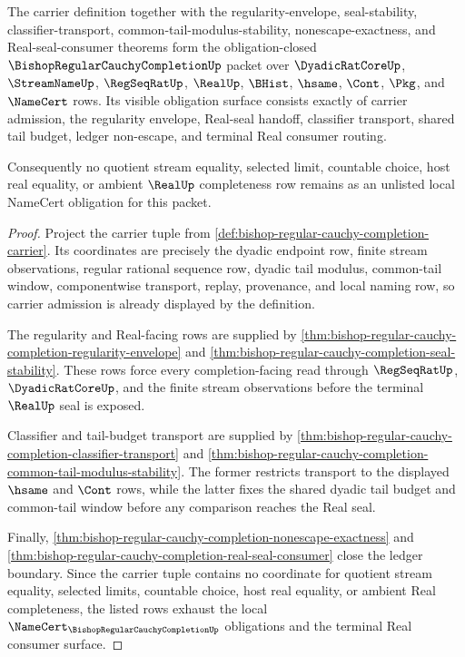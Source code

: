 \begin{theorem}
\label{thm:bishop-regular-cauchy-completion-obligation-closure-package}
The carrier definition together with the regularity-envelope, seal-stability, classifier-transport, common-tail-modulus-stability, nonescape-exactness, and Real-seal-consumer theorems form the obligation-closed $\BishopRegularCauchyCompletionUp$ packet over $\DyadicRatCoreUp$, $\StreamNameUp$, $\RegSeqRatUp$, $\RealUp$, $\BHist$, $\hsame$, $\Cont$, $\Pkg$, and $\NameCert$ rows. Its visible obligation surface consists exactly of carrier admission, the regularity envelope, Real-seal handoff, classifier transport, shared tail budget, ledger non-escape, and terminal Real consumer routing.

Consequently no quotient stream equality, selected limit, countable choice, host real equality, or ambient $\RealUp$ completeness row remains as an unlisted local NameCert obligation for this packet.
\end{theorem}
\begin{proof}
Project the carrier tuple from \autoref{def:bishop-regular-cauchy-completion-carrier}. Its coordinates are precisely the dyadic endpoint row, finite stream observations, regular rational sequence row, dyadic tail modulus, common-tail window, componentwise transport, replay, provenance, and local naming row, so carrier admission is already displayed by the definition.

The regularity and Real-facing rows are supplied by \autoref{thm:bishop-regular-cauchy-completion-regularity-envelope} and \autoref{thm:bishop-regular-cauchy-completion-seal-stability}. These rows force every completion-facing read through $\RegSeqRatUp$, $\DyadicRatCoreUp$, and the finite stream observations before the terminal $\RealUp$ seal is exposed.

Classifier and tail-budget transport are supplied by \autoref{thm:bishop-regular-cauchy-completion-classifier-transport} and \autoref{thm:bishop-regular-cauchy-completion-common-tail-modulus-stability}. The former restricts transport to the displayed $\hsame$ and $\Cont$ rows, while the latter fixes the shared dyadic tail budget and common-tail window before any comparison reaches the Real seal.

Finally, \autoref{thm:bishop-regular-cauchy-completion-nonescape-exactness} and \autoref{thm:bishop-regular-cauchy-completion-real-seal-consumer} close the ledger boundary. Since the carrier tuple contains no coordinate for quotient stream equality, selected limits, countable choice, host real equality, or ambient Real completeness, the listed rows exhaust the local $\NameCert_{\BishopRegularCauchyCompletionUp}$ obligations and the terminal Real consumer surface.
\end{proof}


